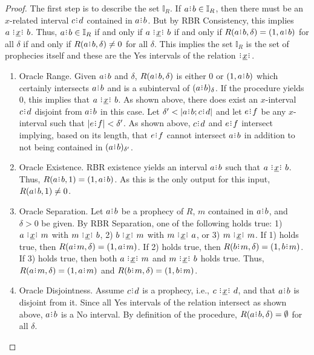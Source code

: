 \documentclass[12pt]{article}
\begin{document}
\begin{proof}

    The first step is to describe the set $\mathbb{I}_R$. If $a\rint b \in \mathbb{I}_R$, then there must be an $x$-related interval $c\rint d$ contained in $a\rint b$. But by RBR Consistency, this implies $a \xrel b$. Thus, $a\rint b \in \mathbb{I}_R$ if and only if $a \xrel b$ if and only if $R(a\rint b, \delta) = (1, a\rint b)$ for all $\delta$ if and only if $R(a\rint b, \delta) \neq 0$ for all $\delta$. This implies the set $\mathbb{I}_R$ is the set of prophecies itself and these are the Yes intervals of the relation $\xrel$. 

    \begin{enumerate}
        \item Oracle Range. Given $a\rint b$ and $\delta$, $R(a\rint b, \delta)$ is either $0$ or $(1, a\rint b)$ which certainly intersects $a\rint b$ and is a subinterval  of $\halo{a\rint b}$. If the procedure yields $0$, this implies that \sout{$a \xrel b$}. As shown above, there does exist an $x$-interval $c\rint d$ disjoint from $a\rint b$ in this case. Let $\delta' < |a \rint b; c \rint d|$ and let $e \rint f$ be any $x$-interval such that $|e \rint f| < \delta'$. As shown above, $c \rint d$ and $e \rint f$ intersect implying, based on its length, that $e \rint f$ cannot intersect $a \rint b$ in addition to not being contained in $\halo[\delta']{a \rint b}$. 
        
        \item Oracle Existence. RBR existence yields an interval $a\rint b$ such that $a \xrel b$. Thus, $R(a\rint b, 1) = (1, a\rint b)$. As this is the only output for this input, $R(a\rint b, 1) \neq 0$. 
        
        \item Oracle Separation. Let $a\rint b$ be a prophecy of $R$, $m$ contained in $a\rint b$, and $\delta >0$ be given. 
        By RBR Separation, one of the following holds true: 1) $a \xrel m$ with \sout{$m \xrel b$}, 2) $b \xrel m$ with \sout{$m \xrel a$}, or 3) $m \xrel m$.  If 1) holds true, then $R(a\rint m, \delta) = (1, a\rint m)$. If 2) holds true, then $R(b\rint m,\delta) = (1, b\rint m)$.  If 3) holds true, then both $a \xrel m$ and $m \xrel b$ holds true. Thus, $R(a\rint m, \delta) = (1, a\rint m)$ and $R(b\rint m, \delta) = (1, b\rint m)$. 

        \item Oracle Disjointness. Assume $c\rint d$ is a prophecy, i.e., $c \xrel d$, and that $a\rint b$ is disjoint from it. Since all Yes intervals of the relation intersect as shown above, $a\rint b$ is a No interval. By definition of the procedure, $R(a\rint b, \delta) = \emptyset$ for all $\delta$. 
        

\end{enumerate}
\end{proof}
\end{document}
